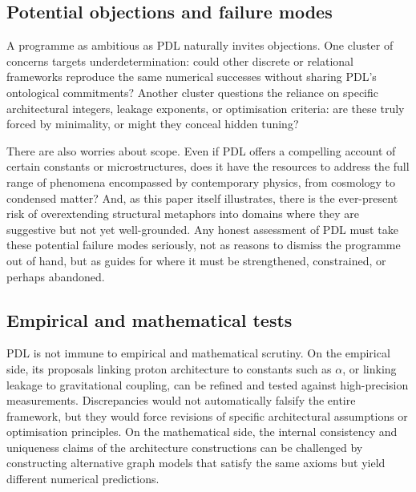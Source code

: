 \documentclass[11pt,a4paper]{article}
\theoremstyle{definition}
\begin{document}
\subsection{Potential objections and failure modes}

A programme as ambitious as PDL naturally invites objections. One cluster of concerns targets underdetermination: could other discrete or relational frameworks reproduce the same numerical successes without sharing PDL’s ontological commitments? Another cluster questions the reliance on specific architectural integers, leakage exponents, or optimisation criteria: are these truly forced by minimality, or might they conceal hidden tuning?\cite{Laubscher_PDL_Position_2024,Laubscher_PDL_GlobalMapping_v6_2024}

There are also worries about scope. Even if PDL offers a compelling account of certain constants or microstructures, does it have the resources to address the full range of phenomena encompassed by contemporary physics, from cosmology to condensed matter? And, as this paper itself illustrates, there is the ever-present risk of overextending structural metaphors into domains where they are suggestive but not yet well-grounded.\cite{Laubscher_Existence_PulsatingClosure_2026} Any honest assessment of PDL must take these potential failure modes seriously, not as reasons to dismiss the programme out of hand, but as guides for where it must be strengthened, constrained, or perhaps abandoned.

\subsection{Empirical and mathematical tests}

PDL is not immune to empirical and mathematical scrutiny. On the empirical side, its proposals linking proton architecture to constants such as \(\alpha\), or linking leakage to gravitational coupling, can be refined and tested against high-precision measurements.\cite{Laubscher_Alpha_v2_2024,Laubscher_UniversalCoherenceLeakage_2024} Discrepancies would not automatically falsify the entire framework, but they would force revisions of specific architectural assumptions or optimisation principles. On the mathematical side, the internal consistency and uniqueness claims of the architecture constructions can be challenged by constructing alternative graph models that satisfy the same axioms but yield different numerical predictions.\cite{Laubscher_ProtonArch_v2_2024,Laubscher_MinimalClosures_46_2024}
\end{document}
